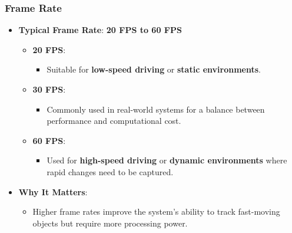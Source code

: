 \subsubsection{Frame Rate}
\begin{itemize}
    \item \textbf{Typical Frame Rate}: \textbf{20 FPS to 60 FPS}
    \begin{itemize}
        \item \textbf{20 FPS}:
        \begin{itemize}
            \item Suitable for \textbf{low-speed driving} or \textbf{static environments}.
        \end{itemize}
        \item \textbf{30 FPS}:
        \begin{itemize}
            \item Commonly used in real-world systems for a balance between performance and computational cost.
        \end{itemize}
        \item \textbf{60 FPS}:
        \begin{itemize}
            \item Used for \textbf{high-speed driving} or \textbf{dynamic environments} where rapid changes need to be captured.
        \end{itemize}
    \end{itemize}
    \item \textbf{Why It Matters}:
    \begin{itemize}
        \item Higher frame rates improve the system's ability to track fast-moving objects but require more processing power.
    \end{itemize}
\end{itemize}

